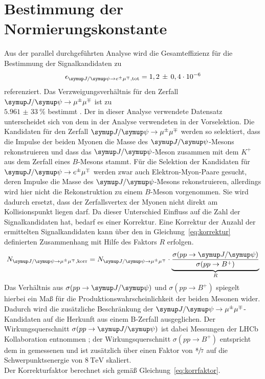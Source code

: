 \section{Bestimmung der Normierungskonstante}
\label{sec:norm}
Aus der parallel durchgeführten Analyse \cite{ba-maik} wird die Gesamteffizienz für die Bestimmung der Signalkandidaten zu
%
\begin{equation}
  \epsilon_{\signal, \text{tot}}=1,2\,\pm\,0,4\cdot 10^{-6}
\end{equation}
%
referenziert. Das Verzweigungsverhältnis für den Zerfall $\kontroll$ ist zu \\$\SI{5,961(33)}{\percent}$ bestimmt \cite{pdg}. Der in
dieser Analyse verwendete Datensatz unterscheidet sich von dem in der Analyse \cite{ba-maik} verwendeten in der Vorselektion. Die
Kandidaten für den Zerfall $\kontroll$ werden so selektiert, dass die Impulse der beiden Myonen die Masse des $\jpsi$-Mesons
rekonstruieren und dass das $\jpsi$-Meson zusammen mit dem $K^+$ aus dem Zerfall eines $B$-Mesons stammt. Für die Selektion der Kandidaten für $\signal$ werden zwar auch Elektron-Myon-Paare gesucht, deren Impulse die Masse des $\jpsi$-Mesons rekonstruieren, allerdings wird
hier nicht die Rekonstruktion zu einem $B$-Meson vorgenommen. Sie wird dadurch ersetzt, dass der Zerfallsvertex der Myonen nicht direkt
am Kollisionspunkt liegen darf. Da dieser Unterschied Einfluss auf die Zahl der Signalkandidaten hat, bedarf es einer Korrektur. Eine Korrektur der Anzahl der ermittelten Signalkandidaten kann über den in Gleichung~\eqref{eq:korrektur} definierten Zusammenhang mit Hilfe des Faktors $R$ erfolgen.
%
\begin{equation}
  N_{\kontroll,\text{korr}}=N_{\kontroll}\cdot\underbrace{\frac{\sigma(pp\rightarrow\jpsi)}{\sigma(pp\rightarrow B^+)}}_{R}
  \label{eq:korrektur}
\end{equation}
%
Das Verhältnis aus $\sigma(pp\rightarrow\jpsi)$ und $\sigma(pp\rightarrow B^+)$ spiegelt hierbei ein Maß für die
Produktionswahrscheinlichkeit der beiden Mesonen wider. Dadurch wird die zusätzliche Beschränkung der $\kontroll$-Kandidaten auf die Herkunft aus einem B-Zerfall ausgeglichen. Der Wirkungsquerschnitt $\sigma(pp\rightarrow\jpsi)$ ist dabei Messungen der LHCb Kollaboration entnommen \cite{sigmajpsi}; der Wirkungsquerschnitt $\sigma(pp\rightarrow B^+)$ entspricht dem in \cite{sigmaB} gemessenen und ist zusätzlich über einen Faktor von $\sfrac{8}{7}$ auf die Schwerpunktsenergie von $\SI{8}{\tera\electronvolt}$ skaliert. \\ Der Korrekturfaktor berechnet sich gemäß Gleichung~\eqref{eq:korrfaktor}.
